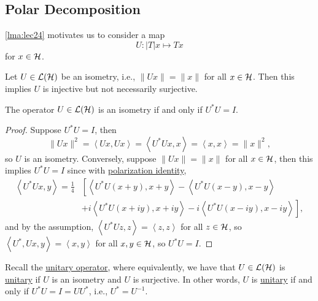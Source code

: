 \subsection{Polar Decomposition}
\autoref{lma:lec24} motivates us to consider a map
\[
	U\colon \vert T \vert x \mapsto Tx
\]
for \(x\in \mathcal{\MakeUppercase{h}} \).

Let \(U\in \mathcal{\MakeUppercase{l}} (\mathcal{\MakeUppercase{h}} )\) be an isometry, i.e., \(\lVert Ux \rVert = \lVert x \rVert \) for all \(x\in \mathcal{\MakeUppercase{h}} \). Then this implies \(U\) is injective but not necessarily surjective.

\begin{lemma}
	The operator \(U\in \mathcal{\MakeUppercase{l}} (\mathcal{\MakeUppercase{h}} )\) is an isometry if and only if \(U^{\ast} U = I\).
\end{lemma}
\begin{proof}
	Suppose \(U^{\ast} U = I\), then
	\[
		\lVert Ux \rVert ^2
		= \left\langle Ux, Ux \right\rangle
		= \left\langle U^{\ast} Ux, x \right\rangle
		= \left\langle x, x \right\rangle
		= \lVert x \rVert ^2,
	\]
	so \(U\) is an isometry. Conversely, suppose \(\lVert Ux \rVert = \lVert x \rVert \) for all \(x\in \mathcal{\MakeUppercase{h}} \), then this implies \(U^{\ast} U = I\) since with \hyperref[lma:polarization-identity]{polarization identity},
	\[
		\begin{split}
			\left\langle U^{\ast} Ux, y \right\rangle
			= \frac{1}{4} &\left[ \left\langle U^{\ast} U(x+y), x+y \right\rangle - \left\langle U^{\ast} U(x-y), x-y \right\rangle \right.\\
				&+ \left. i\left\langle U^{\ast} U(x+iy), x+iy \right\rangle - i\left\langle U^{\ast} U(x-iy), x-iy \right\rangle \right],
		\end{split}
	\]
	and by the assumption, \(\left\langle U^{\ast} Uz, z \right\rangle = \left\langle z, z \right\rangle \) for all \(z\in \mathcal{\MakeUppercase{h}} \), so \(\left\langle U^{\ast} , Ux, y \right\rangle = \left\langle x, y \right\rangle \) for all \(x, y\in \mathcal{\MakeUppercase{h}} \), so \(U^{\ast} U = I\).
\end{proof}

Recall the \hyperref[def:unitary-op]{unitary operator}, where equivalently, we have that \(U\in \mathcal{\MakeUppercase{l}} (\mathcal{\MakeUppercase{h}} )\) is \hyperref[def:unitary-op]{unitary} if \(U\) is an isometry and \(U\) is surjective. In other words, \(U\) is \hyperref[def:unitary-op]{unitary} if and only if \(U^{\ast} U = I = U U^{\ast} \), i.e., \(U^{\ast} = U ^{-1} \).

